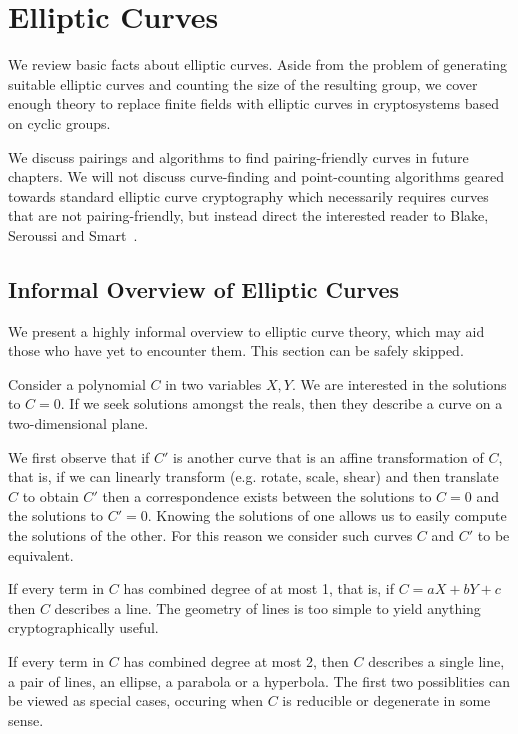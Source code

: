 \chapter {Elliptic Curves}

We review basic facts about elliptic curves. Aside from the problem of
generating suitable elliptic curves and counting the size of the resulting
group, we cover enough theory to replace finite fields with elliptic
curves in cryptosystems based on cyclic groups.

We discuss pairings and algorithms to find pairing-friendly curves in future
chapters. We will not discuss curve-finding and point-counting algorithms
geared towards standard elliptic curve cryptography which necessarily requires
curves that are not pairing-friendly, but instead direct the interested reader
to Blake, Seroussi and Smart~\cite{bss}.

\section {Informal Overview of Elliptic Curves}

We present a highly informal overview to elliptic curve theory, which may aid
those who have yet to encounter them. This section can be safely skipped.

Consider a polynomial $C$ in two variables $X, Y$. We are interested in the
solutions to $C = 0$. If we seek solutions amongst the reals, then they
describe a curve on a two-dimensional plane.

We first observe that if $C'$ is another curve that is an affine transformation
of $C$, that is, if we can linearly transform (e.g. rotate, scale, shear) and
then translate $C$ to obtain $C'$ then a correspondence exists between
the solutions to $C = 0$ and the solutions to $C' = 0$. Knowing the solutions
of one allows us to easily compute the solutions of the other. For this reason
we consider such curves $C$ and $C'$ to be equivalent.

If every term in $C$ has combined degree of at most 1, that is, if
$C = a X + b Y + c$
then $C$ describes a line. The geometry of lines is too simple to yield
anything cryptographically useful.

If every term in $C$ has combined degree at most 2, then $C$ describes a single
line, a pair of lines, an ellipse, a parabola or a hyperbola. The first two
possiblities can be viewed as special cases, occuring when $C$ is reducible or
degenerate in some sense.

